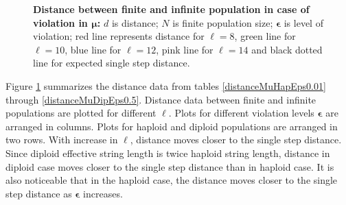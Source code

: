 \begin{figure}[ht]
\begin{center}
\hspace{-3em}%
\caption[\textbf{Distance between finite and infinite population in case of violation in $\bm{\mu}$}]{\textbf{Distance between finite and infinite population in case of violation in $\bm{\mu}$:}  
  $d$ is distance; $N$ is finite population size; $\bm{\epsilon}$ is level of violation;
  red line represents distance for $\ell = 8$, green line for $\ell = 10$, blue line for $\ell = 12$, pink line for $\ell = 14$ 
  and black dotted line for expected single step distance.}
\label{vio_mu_dist}
\end{center}
\end{figure}

Figure \ref{vio_mu_dist} summarizes the distance data from tables \ref{distanceMuHapEps0.01} through  
\ref{distanceMuDipEps0.5}. Distance data between finite and infinite populations are plotted for different $\ell$. 
Plots for different violation levels $\bm{\epsilon}$ are arranged in columns. 
Plots for haploid and diploid populations are arranged in two rows. With increase in $\ell$, 
distance moves closer to the single step distance. Since diploid effective  
string length is twice haploid string length, 
distance in diploid case moves closer to the single step distance than in haploid case. 
It is also noticeable that in the haploid case, 
the distance moves closer to the single step distance as $\bm{\epsilon}$ increases.

